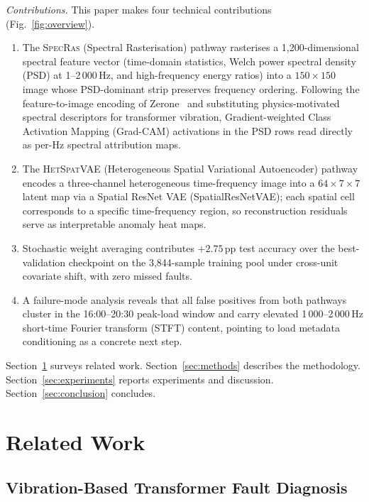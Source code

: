 \documentclass[preprint,12pt,3p]{elsarticle}
\let\cite\citep   %
\newcommand{\zerone}{\textsc{SpecRas}\xspace}      %
\newcommand{\hetspatvae}{\textsc{HetSpatVAE}\xspace} %
\newcommand{\hczv}{\hetspatvae}                    %
\begin{document}
\textit{Contributions.}
This paper makes four technical contributions (Fig.~\ref{fig:overview}).
\begin{enumerate}
\item The \zerone{} (Spectral Rasterisation) pathway rasterises a
1{,}200-dimensional spectral feature vector (time-domain statistics,
Welch power spectral density (PSD) at 1--2\,000\,Hz, and
high-frequency energy ratios) into a $150{\times}150$ image whose
PSD-dominant strip preserves frequency ordering.  Following the
feature-to-image encoding of Zerone~\cite{kim2025zerone} and
substituting physics-motivated spectral descriptors for transformer
vibration, Gradient-weighted Class Activation Mapping (Grad-CAM)
activations in the PSD rows read directly as per-Hz spectral
attribution maps.
\item The \hczv{} (Heterogeneous Spatial Variational Autoencoder) pathway
encodes a three-channel heterogeneous time-frequency image into a
$64{\times}7{\times}7$ latent map via a Spatial ResNet VAE
(SpatialResNetVAE); each spatial cell corresponds to a specific
time-frequency region, so reconstruction residuals serve as
interpretable anomaly heat maps.
\item Stochastic weight averaging \cite{izmailov2018averaging} contributes
$+2.75$\,pp test accuracy over the best-validation checkpoint on the
3{,}844-sample training pool under cross-unit covariate shift, with
zero missed faults.
\item A failure-mode analysis reveals that all false positives from both
pathways cluster in the 16:00--20:30 peak-load window and carry
elevated 1\,000--2\,000\,Hz short-time Fourier transform (STFT) content,
pointing to load metadata conditioning as a concrete next step.
\end{enumerate}

Section~\ref{sec:related} surveys related work.
Section~\ref{sec:methods} describes the methodology.
Section~\ref{sec:experiments} reports experiments and discussion.
Section~\ref{sec:conclusion} concludes.


\section{Related Work}
\label{sec:related}

\subsection{Vibration-Based Transformer Fault Diagnosis}
\end{document}
